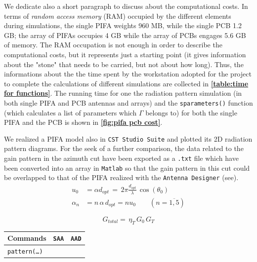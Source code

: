 \documentclass[10 pt,a4paper,twocolumn]{article}
\begin{document}
{We dedicate also a short  paragraph to discuss about the computational costs. In terms of \emph{random access memory} (RAM) occupied by the different elements during simulations, the single PIFA weights 960 MB, while the single PCB 1.2 GB; the array of PIFAs occupies 4 GB while the array of PCBs engages 5.6 GB of memory. The RAM occupation is not enough in order to describe the computational costs, but it represents just a starting point (it gives information about the "stone" that needs to be carried, but not about how long). Thus, the informations about the the time spent by the workstation adopted for the project to complete the calculations of different simulations are collected in \textbf{\cref{table:time for functions}}. The running time for one the radiation pattern simulation (in both single PIFA and PCB antennas and arrays) and the \texttt{sparameters()} function (which calculates a list of parameters which $\Gamma$ belongs to) for both the single PIFA and the PCB is shown in \textbf{\cref{fig:pifa pcb cost}}. 

We realized a PIFA model also in \texttt{CST Studio Suite} and plotted its 2D radiation pattern diagrams. For the seek of a further comparison, the data related to the gain pattern in the azimuth cut have been exported as a \texttt{.txt} file which have been converted into an array in \texttt{Matlab} so that the gain pattern in this cut could be overlapped to that of the PIFA realized with the \texttt{Antenna Designer} (see).
\begin{equation}
	\begin{aligned}
		u_0&=\alpha d_{opt}\,=\,2\pi\frac{d_{opt}}{\lambda}\,\cos(\theta_0)\\
		\alpha_n&=n\,\alpha\,d_{opt}=nu_0\qquad \left(n=\overline{1,5}\right)
		\label{eq:phase coefficients}
	\end{aligned}
\end{equation}

\begin{equation}
	G_{total}=\,\eta_T\,G_0\,G_T
	\label{eq:pattern multiplication}
\end{equation}
\begin{table}[bt!]
	\begin{center}
	{\selectfont
		\begin{tabular}{|m{15.5cm}|c|c|}
			\hline
			\cellcolor{deepsaffron}\textbf{Commands} & \cellcolor{flax}\texttt{SAA} & \cellcolor{flax}\texttt{AAD} \\
			\hline
		 \colorbox{backcolour}{\texttt{pattern(\dots)}}
			

\end{tabular}}
\end{center}
\end{table}}
\end{document}
